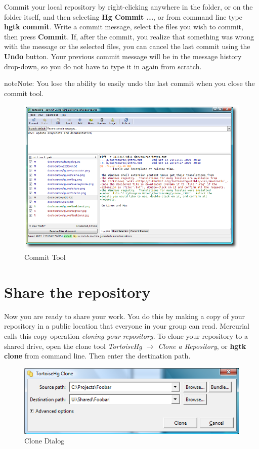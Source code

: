 \documentclass[letterpaper,10pt,english]{manual}
\begin{document}
Commit your local repository by right-clicking anywhere in the folder,
or on the folder itself, and then selecting \textbf{Hg Commit ...},
or from command line type \textbf{hgtk commit}.  Write a commit
message, select the files you wish to commit, then press
\textbf{Commit}. If, after the commit, you realize that something was
wrong with the message or the selected files, you can cancel the last
commit using the \textbf{Undo} button.  Your previous commit message
will be in the message history drop-down, so you do not have to type it
in again from scratch.

\begin{notice}{note}{Note:}
You lose the ability to easily undo the last commit when you close
the commit tool.
\end{notice}
\begin{figure}[htbp]
\centering

\includegraphics{commit.png}
\caption{Commit Tool}\end{figure}


\section{Share the repository}

Now you are ready to share your work. You do this by making a copy of
your repository in a public location that everyone in your group can
read. Mercurial calls this copy operation \emph{cloning your repository}. To
clone your repository to a shared drive, open the clone tool
\emph{TortoiseHg \(\rightarrow\) Clone a Repository}, or
\textbf{hgtk clone} from command line.  Then enter the destination
path.
\begin{figure}[htbp]
\centering

\includegraphics{share.png}
\caption{Clone Dialog}\end{figure}
\end{document}
